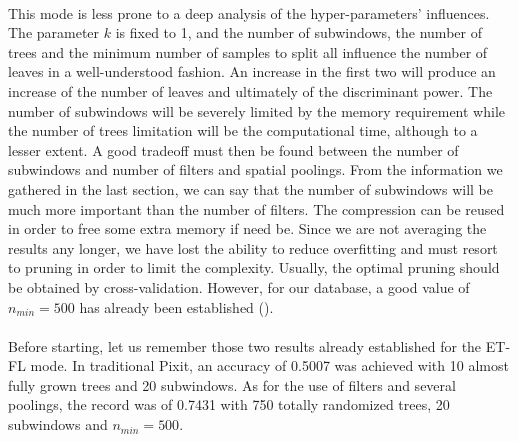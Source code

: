 \documentclass[a4paper]{report}
\begin{document}
	\paragraph{}
	This mode is less prone to a deep analysis of the hyper-parameters' influences. The parameter $k$ is fixed to 1, and the number of subwindows, the number of trees and the minimum number of samples to split all influence the number of leaves in a well-understood fashion. An increase in the first two will produce an increase of the number of leaves and ultimately of the discriminant power. The number of subwindows will be severely limited by the memory requirement while the number of trees limitation will be the computational time, although to a lesser extent. A good tradeoff must then be found between the number of subwindows and number of filters and spatial poolings. From the information we gathered in the last section, we can say that the number of subwindows will be much more important than the number of filters. The compression can be reused in order to free some extra memory if need be.
	Since we are not averaging the results any longer, we have lost the ability to reduce overfitting and must resort to pruning in order to limit the complexity. Usually, the optimal pruning should be obtained by cross-validation. However, for our database, a good value of $n_{min} = 500$ has already been established (\cite{base}). 
	\paragraph{}
	Before starting, let us remember those two results already established for the ET-FL mode. In traditional Pixit, an accuracy of 0.5007 was achieved with 10 almost fully grown trees and 20 subwindows. As for the use of filters and several poolings, the record was of 0.7431 with 750 totally randomized trees, 20 subwindows and $n_{min} = 500$. 
	
	
	
	
	
\end{document}
